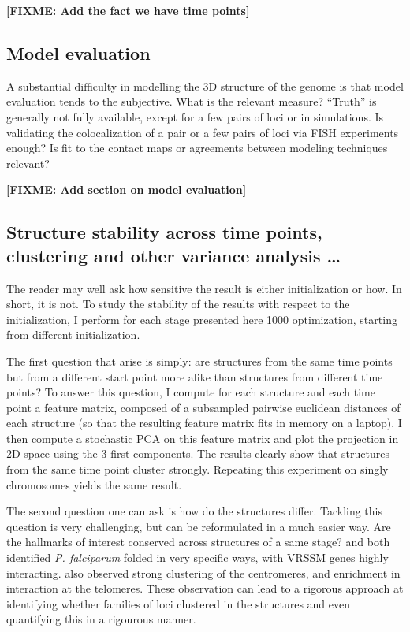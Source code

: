 \documentclass[letterpaper,12pt]{article}
\newcommand{\fixme}[1]{\textbf{[FIXME: #1]}}
\begin{document}
\fixme{Add the fact we have time points}

\subsection*{Model evaluation}

A substantial difficulty in modelling the 3D structure of the genome is that
model evaluation tends to the subjective. What is the relevant measure?
``Truth'' is generally not fully available, except for a few pairs of loci or
in simulations. Is validating the colocalization of a pair or a few pairs of
loci via FISH experiments enough? Is fit to the contact maps or agreements
between modeling techniques relevant? 

\fixme{Add section on model evaluation}



\subsection*{Structure stability across time points, clustering and other
variance analysis \dots}

The reader may well ask how sensitive the result is either initialization or
how. In short, it is not. To study the stability of the results with respect
to the initialization, I perform for each stage presented here 1000
optimization, starting from different initialization. 

The first question that arise is simply: are structures from the same time
points but from a different start point more alike than structures from
different time points? To answer this question, I compute for each structure
and each time point a feature matrix, composed of a subsampled pairwise
euclidean distances of each structure (so that the resulting feature matrix
fits in memory on a laptop). I then compute a stochastic PCA on this feature
matrix and plot the projection in 2D space using the 3 first components. The
results clearly show that structures from the same time point cluster
strongly. Repeating this experiment on singly chromosomes yields the same
result.

The second question one can ask is how do the structures differ. Tackling this
question is very challenging, but can be reformulated in a much easier way.
Are the hallmarks of interest conserved across structures of a same stage?
\citet{ay:three-dimensional} and \citet{lemieux:genome-wide} both identified
{\em P. falciparum} folded in very specific ways, with VRSSM genes highly
interacting. \citet{ay:three-dimensional} also observed strong clustering of
the centromeres, and enrichment in interaction at the telomeres. These
observation can lead to a rigorous approach at identifying whether families
of loci clustered in the structures and even quantifying this in a rigourous
manner.
\end{document}
